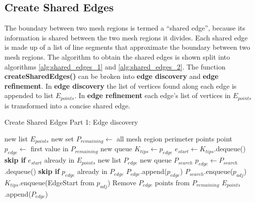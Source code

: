 \subsection{Create Shared Edges}
The boundary between two mesh regions is termed a ``shared edge'', because its information is shared between the two mesh regions it divides.
Each shared edge is made up of a list of line segments that approximate the boundary between two mesh regions.
The algorithm to obtain the shared edges is shown split into algorithms \ref{alg:shared_edges_1} and \ref{alg:shared_edges_2}.
The function \textbf{createSharedEdges()} can be broken into \textbf{edge discovery} and \textbf{edge refinement}.
In \textbf{edge discovery} the list of vertices found along each edge is appended to list $E_{points}$.
In \textbf{edge refinement} each edge's list of vertices in $E_{points}$ is transformed into a concise shared edge.

\begin{algorithm}[!htb]
	\caption{Create Shared Edges Part 1: Edge discovery}\label{alg:shared_edges_1}
\begin{algorithmic}[1]
	\State new list $E_{points}$ 
	\State new set $P_{remaining} \leftarrow$ all mesh region perimeter points
	\label{alg:shared_edges:while_k_remaining}
		\State point $p_{edge} \leftarrow$ first value in $P_{remaining}$
		\State new queue $K_{tips} \leftarrow p_{edge}$ 
		\label{alg:shared_edges:while_k_tips}
			\State $e_{start} \leftarrow K_{tips}$.dequeue()
			\State \textbf{skip if} $e_{start}$ already in $E_{points}$
			\State new list $P_{edge}$ 
			\State new queue $P_{search}$ 
				\State $p_{edge} \leftarrow P_{search}$.dequeue()
				\State \textbf{skip if} $p_{edge}$ already in $P_{edge}$
				\State $P_{edge}$.append($p_{edge}$)
						\State $P_{search}$.enqueue($p_{adj}$)
					\EndIf
						\State $K_{tips}$.enqueue(EdgeStart from $p_{adj}$)
					\EndIf
				\EndFor
			\EndWhile
			\State Remove $P_{edge}$ points from $P_{remaining}$
			\State $E_{points}$.append($P_{edge}$)
		\EndWhile
	\EndWhile
\end{algorithmic}
\end{algorithm}

